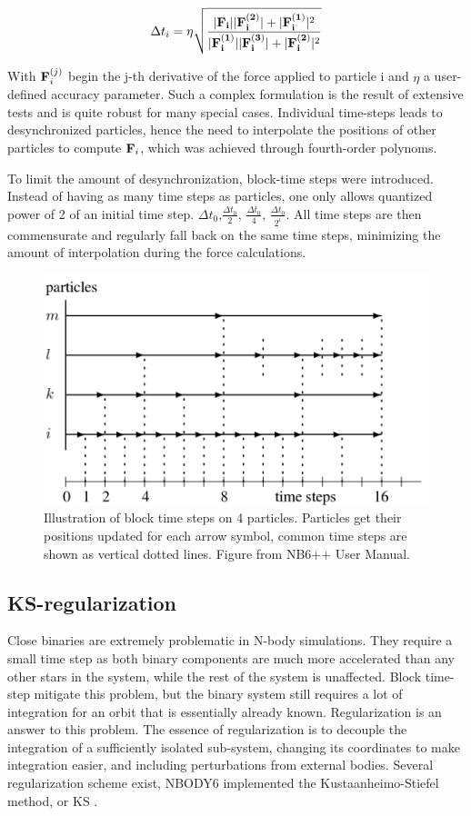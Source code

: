 \begin{equation}
\label{Eq:0_timestep}
\Delta t_i =  \eta \sqrt{\frac{ |\bold{F_i}||\bold{F^{(2)}_i}| + |\bold{F^{(1)}_i}|^2 }{|\bold{F^{(1)}_i}||\bold{F^{(3)}_i}| + |\bold{F^{(2)}_i}|^2}}
\end{equation}
 
With $\bold{F}^{(j)}_i$ begin the j-th derivative of the force applied to particle i and $\eta$ a user-defined accuracy parameter. Such a complex formulation is the result of extensive tests and is quite robust for many special cases. Individual time-steps leads to desynchronized particles, hence the need to interpolate the positions of other particles to compute $\bold{F}_i$, which was achieved through fourth-order polynoms.
 
 To limit the amount of desynchronization, block-time steps were introduced. Instead of having as many time steps as particles, one only allows quantized power of 2 of an initial time step. $\Delta t_0$,$\frac{\Delta t_0}{2}$, $\frac{\Delta t_0}{4}$, $\frac{\Delta t_0}{2^i}$. All time steps are then commensurate and regularly fall back on the same time steps, minimizing the amount of interpolation during the force calculations.
 
\begin{figure}
\label{Fig:blocktimesteps}
\center
\includegraphics[width=0.6\linewidth]{Figures/0_block_timesteps.png}
\caption{Illustration of block time steps on 4 particles. Particles get their positions updated for each arrow symbol, common time steps are shown as vertical dotted lines. Figure from NB6++ User Manual. }
\end{figure} 
 
 
\subsection{KS-regularization}

Close binaries are extremely problematic in N-body simulations. They require a small time step as both binary components are much more accelerated than any other stars in the system, while the rest of the system is unaffected. Block time-step mitigate this problem, but the binary system still requires a lot of integration for an orbit that is essentially already known. Regularization is an answer to this problem. The essence of regularization is to decouple the integration of a sufficiently isolated sub-system, changing its coordinates to make integration easier, and including perturbations from external bodies. Several regularization scheme exist, NBODY6 implemented the Kustaanheimo-Stiefel method, or KS \citep{KS1965}.

